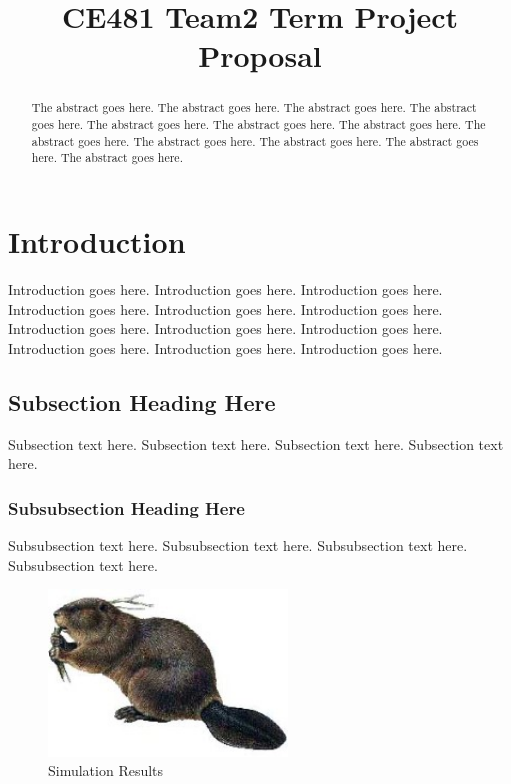 \documentclass[conference,onecolumn]{IEEEtran} %
\begin{document}
%
\title{CE481 Team2 Term Project Proposal}


\author{
}


\maketitle


\begin{abstract}
The abstract goes here. The abstract goes here. The abstract goes here. The abstract goes here.
The abstract goes here. The abstract goes here. The abstract goes here. The abstract goes here.
The abstract goes here. The abstract goes here. The abstract goes here. The abstract goes here.
\end{abstract}


\section{Introduction}
Introduction goes here. Introduction goes here. Introduction goes here. Introduction goes here.
Introduction goes here. Introduction goes here. Introduction goes here. Introduction goes here.
Introduction goes here. Introduction goes here. Introduction goes here. Introduction goes here.

\subsection{Subsection Heading Here}
Subsection text here. Subsection text here. Subsection text here. Subsection text here.


\subsubsection{Subsubsection Heading Here}
Subsubsection text here. Subsubsection text here. Subsubsection text here. Subsubsection text here.

\begin{figure}[!h]
  \centering
    \includegraphics[width=2.5in]{beaver.jpg}
  \caption{Simulation Results}
  \label{figlabel}
\end{figure}
\end{document}
